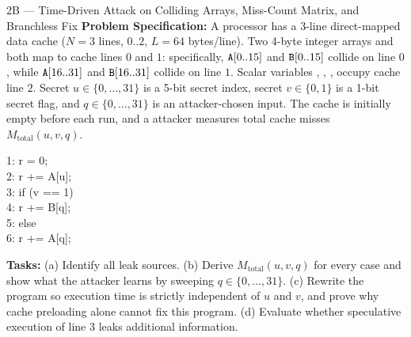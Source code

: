 \begin{templatebox}{2B --- Time-Driven Attack on Colliding Arrays, Miss-Count Matrix, and Branchless Fix}
\textbf{Problem Specification:} A processor has a 3-line direct-mapped data cache ($N = 3$ lines, $0..2$, $L = 64$ bytes/line). Two 4-byte integer arrays  and  both map to cache lines $0$ and $1$: specifically, $\texttt{A}[0..15]$ and $\texttt{B}[0..15]$ collide on line $0$, while $\texttt{A}[16..31]$ and $\texttt{B}[16..31]$ collide on line $1$. Scalar variables , , ,  occupy cache line $2$. Secret $u \in \{0,\dots,31\}$ is a 5-bit secret index, secret $v \in \{0,1\}$ is a 1-bit secret flag, and $q \in \{0,\dots,31\}$ is an attacker-chosen input. The cache is initially empty before each run, and a  attacker measures total cache misses $M_{\text{total}}(u, v, q)$.
\begin{codeblock}
1: r = 0;\\
2: r += A[u];\\
3: if (v == 1)\\
4: \hspace*{1.5em} r += B[q];\\
5: else\\
6: \hspace*{1.5em} r += A[q];
\end{codeblock}
\textbf{Tasks:} (a) Identify all leak sources. (b) Derive $M_{\text{total}}(u,v,q)$ for every case and show what the attacker learns by sweeping $q \in \{0,\dots,31\}$. (c) Rewrite the program so execution time is strictly independent of $u$ and $v$, and prove why cache preloading alone cannot fix this program. (d) Evaluate whether speculative execution of line 3 leaks additional information.


\end{templatebox}
